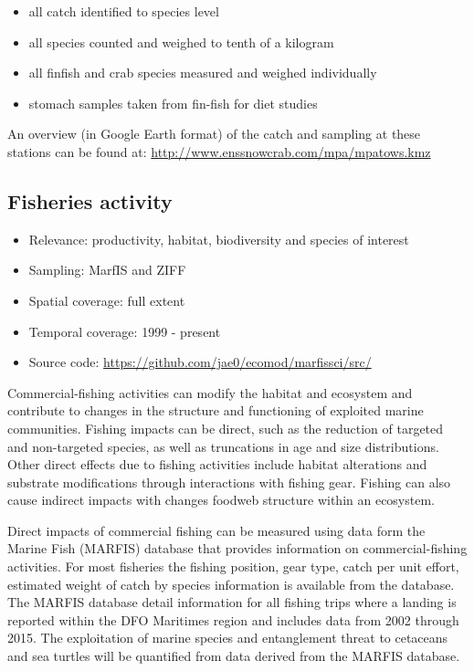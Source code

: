\documentclass[letterpaper,portrait,11pt]{scrartcl}
\numberwithin{equation}{section}		%
\numberwithin{figure}{section}		%
\numberwithin{table}{section}				%
\begin{document}
\begin{itemize}
  \item all catch identified to species level
  \item all species counted and weighed to tenth of a kilogram
  \item all finfish and crab species measured and weighed individually
  \item stomach samples taken from fin-fish for diet studies
\end{itemize}

An overview (in Google Earth format) of the catch and sampling at these stations can be found at: \url{http://www.enssnowcrab.com/mpa/mpatows.kmz}


\subsection{Fisheries activity}


\begin{itemize}
	\item Relevance:  productivity, habitat, biodiversity and species of interest
	\item Sampling:  MarfIS and ZIFF
	\item Spatial coverage: full extent 
	\item Temporal coverage: 1999 - present
	\item Source code: \url{https://github.com/jae0/ecomod/marfissci/src/}
\end{itemize}	



Commercial-fishing activities can modify the habitat and ecosystem and contribute to changes in the structure and functioning of exploited marine communities.  Fishing impacts can be direct, such as the reduction of targeted and non-targeted species, as well as truncations in age and size distributions.  Other direct effects due to fishing activities include habitat alterations and substrate modifications through interactions with fishing gear. Fishing can also cause indirect impacts with changes foodweb structure within an ecosystem.  

Direct impacts of commercial fishing can be measured using data form the Marine Fish (MARFIS) database that provides information on commercial-fishing activities.  For most fisheries the fishing position, gear type, catch per unit effort, estimated weight of catch by species information is available from the database. The MARFIS database detail information for all fishing trips where a landing is reported within the DFO Maritimes region and includes data from 2002 through 2015.    The exploitation of marine species and entanglement threat to cetaceans and sea turtles will be quantified from data derived from the MARFIS database.
   
\end{document}
